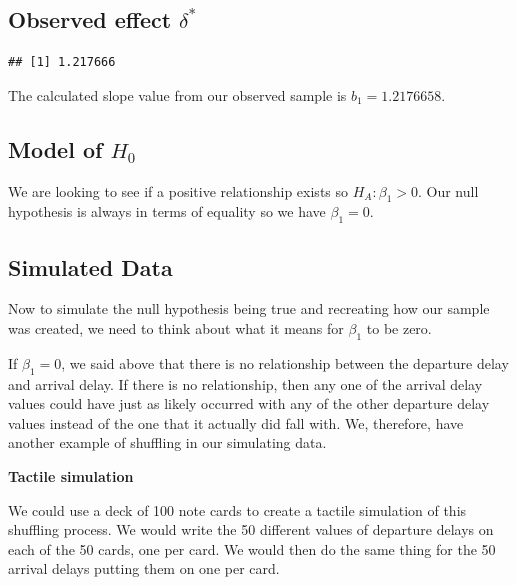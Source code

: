 \documentclass[]{tufte-book}
\newenvironment{Shaded}{\begin{snugshade}}{\end{snugshade}}
\newcommand{\KeywordTok}[1]{\textcolor[rgb]{0.13,0.29,0.53}{\textbf{{#1}}}}
\newcommand{\DecValTok}[1]{\textcolor[rgb]{0.00,0.00,0.81}{{#1}}}
\newcommand{\StringTok}[1]{\textcolor[rgb]{0.31,0.60,0.02}{{#1}}}
\newcommand{\NormalTok}[1]{{#1}}
\begin{document}
\subsection{\texorpdfstring{Observed effect
\(\delta^*\)}{Observed effect \textbackslash{}delta\^{}*}}\label{observed-effect-delta-2}

\begin{Shaded}
\end{Shaded}

\begin{verbatim}
## [1] 1.217666
\end{verbatim}

The calculated slope value from our observed sample is
\(b_1 = 1.2176658\).

\subsection{\texorpdfstring{Model of
\(H_0\)}{Model of H\_0}}\label{model-of-h_0-2}

We are looking to see if a positive relationship exists so
\(H_A: \beta_1 > 0\). Our null hypothesis is always in terms of equality
so we have \(\beta_1 = 0\).

\subsection{Simulated Data}\label{simulated-data-2}

Now to simulate the null hypothesis being true and recreating how our
sample was created, we need to think about what it means for \(\beta_1\)
to be zero.

If \(\beta_1 = 0\), we said above that there is no relationship between
the departure delay and arrival delay. If there is no relationship, then
any one of the arrival delay values could have just as likely occurred
with any of the other departure delay values instead of the one that it
actually did fall with. We, therefore, have another example of shuffling
in our simulating data.

\textbf{Tactile simulation}

We could use a deck of 100 note cards to create a tactile simulation of
this shuffling process. We would write the 50 different values of
departure delays on each of the 50 cards, one per card. We would then do
the same thing for the 50 arrival delays putting them on one per card.
\end{document}
